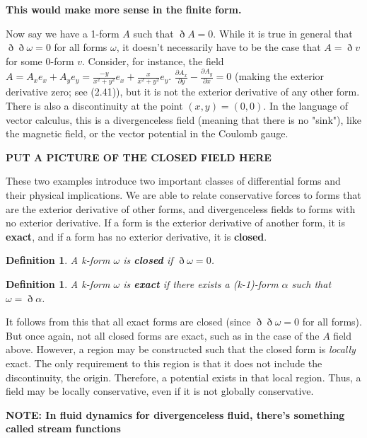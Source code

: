 \documentclass{book}
\newtheorem{defn}[equation]{Definition}
\begin{document}
\textbf{This would make more sense in the finite form.}

Now say we have a 1-form $A$ such that $\eth A = 0.$ While it is true in general that $\eth\eth\omega = 0$ for all forms $\omega$, it doesn't necessarily have to be the case that $A = \eth v$ for some 0-form $v.$ Consider, for instance, the field $A = A_x e_x + A_y e_y = \frac{-y}{x^2 + y^2} e_x + \frac{x}{x^2 + y^2} e_y$. $\frac{\partial A_x}{\partial y} - \frac{\partial A_y}{\partial x} = 0$ (making the exterior derivative zero; see (2.41)), but it is not the exterior derivative of any other form. There is also a discontinuity at the point $(x,y) = (0,0)$. In the language of vector calculus, this is a divergenceless field (meaning that there is no "sink"), like the magnetic field, or the vector potential in the Coulomb gauge.  

\textbf{PUT A PICTURE OF THE CLOSED FIELD HERE}

These two examples introduce two important classes of differential forms and their physical implications. We are able to relate conservative forces to forms that are the exterior derivative of other forms, and divergenceless fields to forms with no exterior derivative. If a form is the exterior derivative of another form, it is \textbf{exact}, and if a form has no exterior derivative, it is \textbf{closed}.
 
\begin{defn} 
	A k-form \textbf{$\omega$} is \textbf{closed} if $\eth\omega = 0$. 
\end{defn}

\begin{defn} 
	A k-form \textbf{$\omega$} is \textbf{exact} if there exists a (k-1)-form $\alpha$ such that $\omega = \eth\alpha$.
\end{defn}



It follows from this that all exact forms are closed (since $\eth\eth\omega = 0$ for all forms). But once again, not all closed forms are exact, such as in the case of the $A$ field above. However, a region may be constructed such that the closed form is \emph{locally} exact. The only requirement to this region is that it does not include the discontinuity, the origin. Therefore, a potential exists in that local region. Thus, a field may be locally conservative, even if it is not globally conservative. 




\textbf{NOTE: In fluid dynamics for divergenceless fluid, there's something called stream functions}
\end{document}
